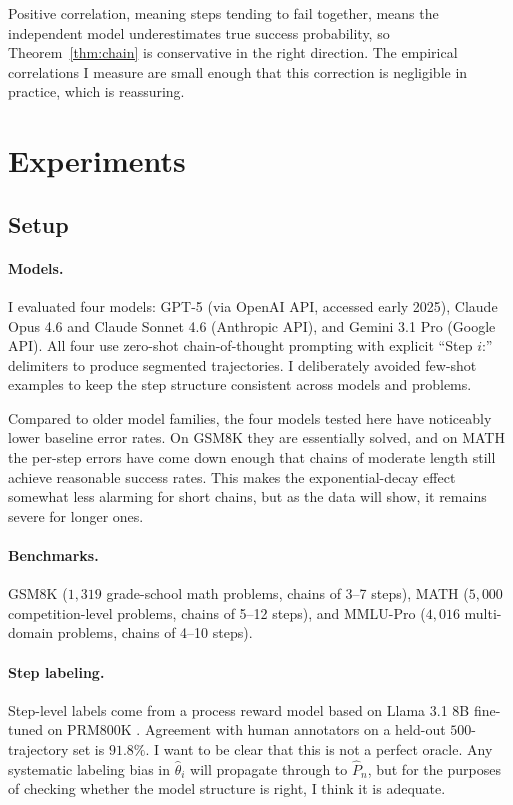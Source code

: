 \documentclass[11pt]{article}
\theoremstyle{plain}
\theoremstyle{definition}
\begin{document}
Positive correlation, meaning steps tending to fail together, means the independent
model underestimates true success probability, so Theorem~\ref{thm:chain} is
conservative in the right direction. The empirical correlations I measure are
small enough that this correction is negligible in practice, which is reassuring.

\section{Experiments}
\label{sec:experiments}

\subsection{Setup}

\paragraph{Models.}
I evaluated four models: GPT-5 (via OpenAI API, accessed early 2025), Claude
Opus 4.6 and Claude Sonnet 4.6 (Anthropic API), and Gemini 3.1 Pro (Google
API). All four use zero-shot chain-of-thought prompting with explicit ``Step $i$:''
delimiters to produce segmented trajectories. I deliberately avoided few-shot
examples to keep the step structure consistent across models and problems.

Compared to older model families, the four models tested here have noticeably
lower baseline error rates. On GSM8K they are essentially solved, and on MATH
the per-step errors have come down enough that chains of moderate length still
achieve reasonable success rates. This makes the exponential-decay effect
somewhat less alarming for short chains, but as the data will show, it remains
severe for longer ones.

\paragraph{Benchmarks.}
GSM8K \citep{cobbe2021training} ($1{,}319$ grade-school math problems, chains
of 3--7 steps), MATH \citep{hendrycks2021measuring} ($5{,}000$ competition-level
problems, chains of 5--12 steps), and MMLU-Pro \citep{wang2024mmlu} ($4{,}016$
multi-domain problems, chains of 4--10 steps).

\paragraph{Step labeling.}
Step-level labels come from a process reward model based on Llama 3.1 8B
fine-tuned on PRM800K \citep{lightman2023let}. Agreement with human annotators
on a held-out $500$-trajectory set is $91.8\%$. I want to be clear that this
is not a perfect oracle. Any systematic labeling bias in $\hat\theta_i$ will
propagate through to $\hat P_n$, but for the purposes of checking whether the
model structure is right, I think it is adequate.
\end{document}
